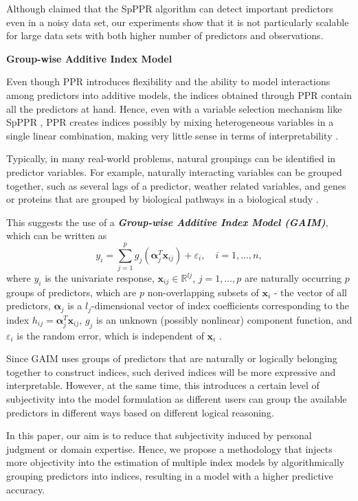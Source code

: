 \documentclass[11pt,a4paper,]{article}
\begin{document}
Although \textcite{Zhang2008} claimed that the SpPPR algorithm can
detect important predictors even in a noisy data set, our experiments
show that it is not particularly scalable for large data sets with both
higher number of predictors and observations. \newline

\textbf{Group-wise Additive Index Model}

Even though PPR introduces flexibility and the ability to model
interactions among predictors into additive models, the indices obtained
through PPR contain all the predictors at hand. Hence, even with a
variable selection mechanism like SpPPR \autocite{Zhang2008}, PPR
creates indices possibly by mixing heterogeneous variables in a single
linear combination, making very little sense in terms of
interpretability \autocite{Masselot2022}.

Typically, in many real-world problems, natural groupings can be
identified in predictor variables. For example, naturally interacting
variables can be grouped together, such as several lags of a predictor,
weather related variables, and genes or proteins that are grouped by
biological pathways in a biological study
\autocite{Masselot2022,Wang2015}.

This suggests the use of a \textbf{\emph{Group-wise Additive Index Model
(GAIM)}}, which can be written as \[
  y_{i} = \sum_{j = 1}^{p} g_{j}(\bm{\alpha}_{j}^{T}\bm{x}_{ij}) + \varepsilon_{i}, \quad i = 1, \dots, n, 
\] where \(y_{i}\) is the univariate response,
\(\bm{x}_{ij} \in \mathbb{R}^{l{j}}\), \(j = 1, \dots, p\) are naturally
occurring \(p\) groups of predictors, which are \(p\) non-overlapping
subsets of \(\bm{x}_{i}\) - the vector of all predictors,
\(\bm{\alpha}_{j}\) is a \(l_{j}\)-dimensional vector of index
coefficients corresponding to the index
\(h_{ij} = \bm{\alpha}_{j}^{T}\bm{x}_{ij}\), \(g_{j}\) is an unknown
(possibly nonlinear) component function, and \(\varepsilon_{i}\) is the
random error, which is independent of \(\bm{x}_{i}\)
\autocite{Wang2015-mp,Masselot2022}.

Since GAIM uses groups of predictors that are naturally or logically
belonging together to construct indices, such derived indices will be
more expressive and interpretable. However, at the same time, this
introduces a certain level of subjectivity into the model formulation as
different users can group the available predictors in different ways
based on different logical reasoning.

In this paper, our aim is to reduce that subjectivity induced by
personal judgment or domain expertise. Hence, we propose a methodology
that injects more objectivity into the estimation of multiple index
models by algorithmically grouping predictors into indices, resulting in
a model with a higher predictive accuracy. \newline
\end{document}
